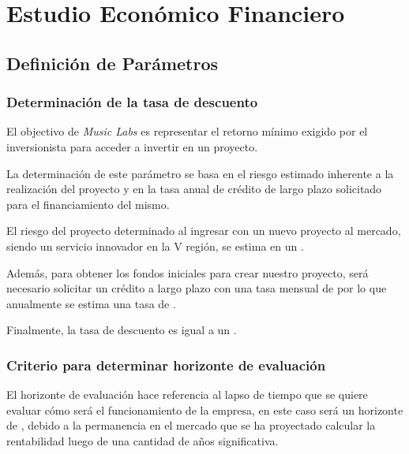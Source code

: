 \section{Estudio Económico Financiero}
    \subsection{Definición de Parámetros}
    	\subsubsection{Determinación de la tasa de descuento}
            El objectivo de \emph{Music Labs} es representar el retorno mínimo exigido por
            el inversionista para acceder a invertir en un proyecto.
                    
            La determinación de este parámetro se basa en el riesgo estimado inherente
            a la realización del proyecto y en la tasa anual de crédito de largo plazo
            solicitado para el financiamiento del mismo.
           
            El riesgo del proyecto determinado al ingresar con un nuevo proyecto
            al mercado, siendo un servicio innovador en la V región, se estima en un
            .

            Además, para obtener los fondos iniciales para crear nuestro proyecto,
            será necesario solicitar un crédito a largo plazo con una tasa mensual de 
            por lo que anualmente se estima una tasa de .

            Finalmente, la tasa de descuento es igual a un .

	    \subsubsection{Criterio para determinar horizonte de evaluación}
            El horizonte de evaluación hace referencia al lapso de tiempo
            que se quiere evaluar cómo será el funcionamiento de la empresa,
            en este caso  será un horizonte de , debido 
            a la permanencia en el mercado que se ha proyectado calcular
            la rentabilidad luego de una cantidad de años significativa.

